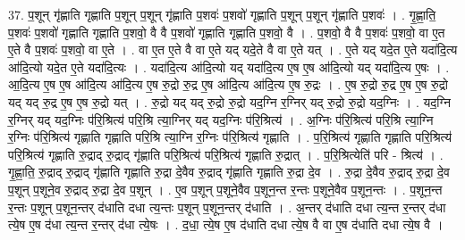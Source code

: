 \documentclass[17pt]{extarticle}
\begin{document}
37. प॒शून् गृ॑ह्णाति गृह्णाति प॒शून् प॒शून् गृ॑ह्णाति प॒शवः॑ प॒शवो॑ गृह्णाति प॒शून् प॒शून् गृ॑ह्णाति प॒शवः॑ । . गृ॒ह्णा॒ति॒ प॒शवः॑ प॒शवो॑ गृह्णाति गृह्णाति प॒शवो॒ वै वै प॒शवो॑ गृह्णाति गृह्णाति प॒शवो॒ वै । . प॒शवो॒ वै वै प॒शवः॑ प॒शवो॒ वा ए॒त ए॒ते वै प॒शवः॑ प॒शवो॒ वा ए॒ते । . वा ए॒त ए॒ते वै वा ए॒ते यद् यदे॒ते वै वा ए॒ते यत् । . ए॒ते यद् यदे॒त ए॒ते यदा॑दि॒त्य आ॑दि॒त्यो यदे॒त ए॒ते यदा॑दि॒त्यः । . यदा॑दि॒त्य आ॑दि॒त्यो यद् यदा॑दि॒त्य ए॒ष ए॒ष आ॑दि॒त्यो यद् यदा॑दि॒त्य ए॒षः । . आ॒दि॒त्य ए॒ष ए॒ष आ॑दि॒त्य आ॑दि॒त्य ए॒ष रु॒द्रो रु॒द्र ए॒ष आ॑दि॒त्य आ॑दि॒त्य ए॒ष रु॒द्रः । . ए॒ष रु॒द्रो रु॒द्र ए॒ष ए॒ष रु॒द्रो यद् यद् रु॒द्र ए॒ष ए॒ष रु॒द्रो यत् । . रु॒द्रो यद् यद् रु॒द्रो रु॒द्रो यद॒ग्नि र॒ग्निर् यद् रु॒द्रो रु॒द्रो यद॒ग्निः । . यद॒ग्नि र॒ग्निर् यद् यद॒ग्निः प॑रि॒श्रित्य॑ परि॒श्रि त्या॒ग्निर् यद् यद॒ग्निः प॑रि॒श्रित्य॑ । . अ॒ग्निः प॑रि॒श्रित्य॑ परि॒श्रि त्या॒ग्नि र॒ग्निः प॑रि॒श्रित्य॑ गृह्णाति गृह्णाति परि॒श्रि त्या॒ग्नि र॒ग्निः प॑रि॒श्रित्य॑ गृह्णाति । . प॒रि॒श्रित्य॑ गृह्णाति गृह्णाति परि॒श्रित्य॑ परि॒श्रित्य॑ गृह्णाति रु॒द्राद् रु॒द्राद् गृ॑ह्णाति परि॒श्रित्य॑ परि॒श्रित्य॑ गृह्णाति रु॒द्रात् । . प॒रि॒श्रित्येति॑ परि - श्रित्य॑ । . गृ॒ह्णा॒ति॒ रु॒द्राद् रु॒द्राद् गृ॑ह्णाति गृह्णाति रु॒द्रा दे॒वैव रु॒द्राद् गृ॑ह्णाति गृह्णाति रु॒द्रा दे॒व । . रु॒द्रा दे॒वैव रु॒द्राद् रु॒द्रा दे॒व प॒शून् प॒शूने॒व रु॒द्राद् रु॒द्रा दे॒व प॒शून् । . ए॒व प॒शून् प॒शूने॒वैव प॒शून॒न्त र॒न्तः प॒शूने॒वैव प॒शून॒न्तः । . प॒शून॒न्त र॒न्तः प॒शून् प॒शून॒न्तर् द॑धाति दधा त्य॒न्तः प॒शून् प॒शून॒न्तर् द॑धाति । . अ॒न्तर् द॑धाति दधा त्य॒न्त र॒न्तर् द॑धा त्ये॒ष ए॒ष द॑धा त्य॒न्त र॒न्तर् द॑धा त्ये॒षः । . द॒धा॒ त्ये॒ष ए॒ष द॑धाति दधा त्ये॒ष वै वा ए॒ष द॑धाति दधा त्ये॒ष वै । \newline
\pagebreak
{}
\end{document}
